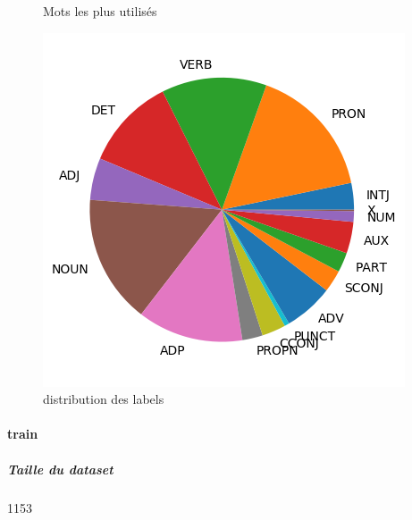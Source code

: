 \begin{figure}[H]
\begin{minipage}{0.48\textwidth}
\begin{tabular}{|l || *{11 }{|c} |}
\end{tabular}
\caption{ Mots les plus utilisés } \label{Fig:muw}\end{minipage} 
\begin{minipage}{0.48\textwidth} \centering
\label{Fig:spokentest_img.png}
\caption{distribution des labels}\includegraphics[width=.7\linewidth]{spokentest_img.png}

\end{minipage}
\end{figure}\paragraph{train}
\subparagraph{Taille du dataset}1153
